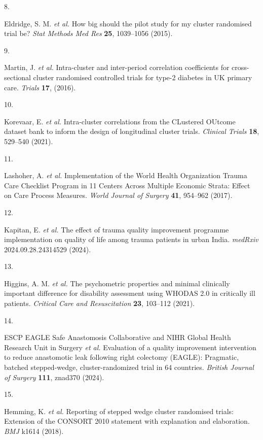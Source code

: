 \documentclass[
]{scrartcl}
\newlength{\cslhangindent}
\newlength{\csllabelwidth}
\newenvironment{CSLReferences}[2] %
 {\begin{list}{}{%
  \setlength{\itemindent}{0pt}
  \setlength{\leftmargin}{0pt}
  \setlength{\parsep}{0pt}
  \ifodd #1
   \setlength{\leftmargin}{\cslhangindent}
   \setlength{\itemindent}{-1\cslhangindent}
  \fi
  \setlength{\itemsep}{#2\baselineskip}}}
 {\end{list}}
\newcommand{\CSLLeftMargin}[1]{\parbox[t]{\csllabelwidth}{\strut#1\strut}}
\newcommand{\CSLRightInline}[1]{\parbox[t]{\linewidth - \csllabelwidth}{\strut#1\strut}}
\begin{document}
\begin{CSLReferences}{0}{0}
\CSLLeftMargin{8. }%
\CSLRightInline{Eldridge, S. M. \emph{et al.} How big should the pilot
study for my cluster randomised trial be? \emph{Stat Methods Med Res}
\textbf{25}, 1039--1056 (2015).}

\CSLLeftMargin{9. }%
\CSLRightInline{Martin, J. \emph{et al.} Intra-cluster and inter-period
correlation coefficients for cross-sectional cluster randomised
controlled trials for type-2 diabetes in UK primary care. \emph{Trials}
\textbf{17}, (2016).}

\CSLLeftMargin{10. }%
\CSLRightInline{Korevaar, E. \emph{et al.} Intra-cluster correlations
from the CLustered OUtcome dataset bank to inform the design of
longitudinal cluster trials. \emph{Clinical Trials} \textbf{18},
529--540 (2021).}

\CSLLeftMargin{11. }%
\CSLRightInline{Lashoher, A. \emph{et al.} Implementation of the {World}
{Health} {Organization} {Trauma} {Care} {Checklist} {Program} in 11
{Centers} {Across} {Multiple} {Economic} {Strata}: {Effect} on {Care}
{Process} {Measures}. \emph{World Journal of Surgery} \textbf{41},
954--962 (2017).}

\CSLLeftMargin{12. }%
\CSLRightInline{Kapitan, E. \emph{et al.} The effect of trauma quality
improvement programme implementation on quality of life among trauma
patients in urban {India}. \emph{medRxiv} 2024.09.28.24314529 (2024).}

\CSLLeftMargin{13. }%
\CSLRightInline{Higgins, A. M. \emph{et al.} The psychometric properties
and minimal clinically important difference for disability assessment
using {WHODAS} 2.0 in critically ill patients. \emph{Critical Care and
Resuscitation} \textbf{23}, 103--112 (2021).}

\CSLLeftMargin{14. }%
\CSLRightInline{ESCP EAGLE Safe Anastomosis Collaborative and NIHR
Global Health Research Unit in Surgery \emph{et al.} Evaluation of a
quality improvement intervention to reduce anastomotic leak following
right colectomy ({EAGLE}): Pragmatic, batched stepped-wedge,
cluster-randomized trial in 64 countries. \emph{British Journal of
Surgery} \textbf{111}, znad370 (2024).}

\CSLLeftMargin{15. }%
\CSLRightInline{Hemming, K. \emph{et al.} Reporting of stepped wedge
cluster randomised trials: Extension of the CONSORT 2010 statement with
explanation and elaboration. \emph{BMJ} k1614 (2018).}


\end{CSLReferences}
\end{document}
